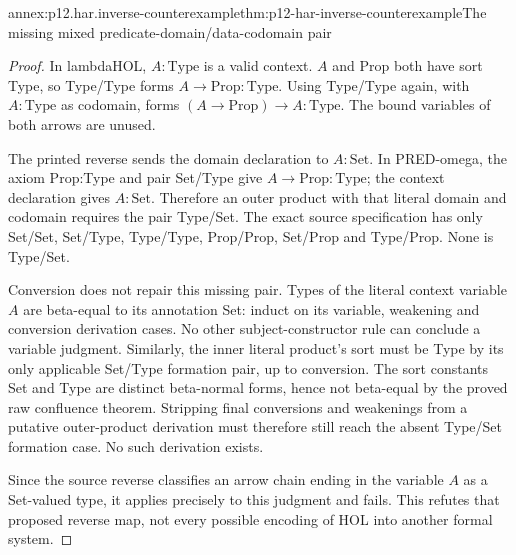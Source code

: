 \begin{annexitem}{annex:p12.har.inverse-counterexample}{thm:p12-har-inverse-counterexample}{The missing mixed predicate-domain/data-codomain pair}
\begin{proof}
In lambdaHOL, \(A:\mathrm{Type}\) is a valid context.
\(A\) and Prop both have sort Type, so Type/Type forms
\(A\to\mathrm{Prop}:\mathrm{Type}\). Using Type/Type again,
with \(A:\mathrm{Type}\) as codomain, forms
\((A\to\mathrm{Prop})\to A:\mathrm{Type}\). The bound
variables of both arrows are unused.

The printed reverse sends the domain declaration to \(A:\mathrm{Set}\).
In PRED-omega, the axiom Prop:Type and pair Set/Type give
\(A\to\mathrm{Prop}:\mathrm{Type}\); the context declaration
gives \(A:\mathrm{Set}\). Therefore an outer product with
that literal domain and codomain requires the pair Type/Set.
The exact source specification has only Set/Set, Set/Type,
Type/Type, Prop/Prop, Set/Prop and Type/Prop. None is Type/Set.

Conversion does not repair this missing pair. Types of the literal
context variable \(A\) are beta-equal to its annotation Set:
induct on its variable, weakening and conversion derivation cases.
No other subject-constructor rule can conclude a variable judgment.
Similarly, the inner literal product's sort must be Type by its only
applicable Set/Type formation pair, up to conversion. The sort constants
Set and Type are distinct beta-normal forms, hence not beta-equal by
the proved raw confluence theorem. Stripping final conversions and
weakenings from a putative outer-product derivation must therefore still
reach the absent Type/Set formation case. No such derivation exists.

Since the source reverse classifies an arrow chain ending in the
variable \(A\) as a Set-valued type, it applies precisely to this
judgment and fails. This refutes that proposed reverse map, not every
possible encoding of HOL into another formal system.
\end{proof}
\end{annexitem}
